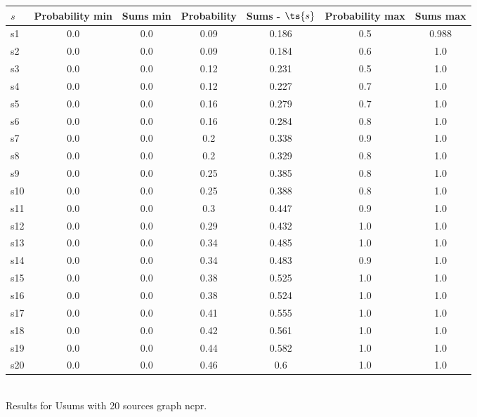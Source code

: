 \documentclass{article}
\begin{document}
\noindent\begin{tabular}{|l|c|c|c|c|c|c|}
\hline
$s$& Probability min & Sums min & Probability & Sums - $\ts{s}$ & Probability max & Sums max\\
\hline
s1 &0.0 & 0.0 & 0.09 & 0.186 & 0.5 & 0.988\\
\hline
s2 &0.0 & 0.0 & 0.09 & 0.184 & 0.6 & 1.0\\
\hline
s3 &0.0 & 0.0 & 0.12 & 0.231 & 0.5 & 1.0\\
\hline
s4 &0.0 & 0.0 & 0.12 & 0.227 & 0.7 & 1.0\\
\hline
s5 &0.0 & 0.0 & 0.16 & 0.279 & 0.7 & 1.0\\
\hline
s6 &0.0 & 0.0 & 0.16 & 0.284 & 0.8 & 1.0\\
\hline
s7 &0.0 & 0.0 & 0.2 & 0.338 & 0.9 & 1.0\\
\hline
s8 &0.0 & 0.0 & 0.2 & 0.329 & 0.8 & 1.0\\
\hline
s9 &0.0 & 0.0 & 0.25 & 0.385 & 0.8 & 1.0\\
\hline
s10 &0.0 & 0.0 & 0.25 & 0.388 & 0.8 & 1.0\\
\hline
s11 &0.0 & 0.0 & 0.3 & 0.447 & 0.9 & 1.0\\
\hline
s12 &0.0 & 0.0 & 0.29 & 0.432 & 1.0 & 1.0\\
\hline
s13 &0.0 & 0.0 & 0.34 & 0.485 & 1.0 & 1.0\\
\hline
s14 &0.0 & 0.0 & 0.34 & 0.483 & 0.9 & 1.0\\
\hline
s15 &0.0 & 0.0 & 0.38 & 0.525 & 1.0 & 1.0\\
\hline
s16 &0.0 & 0.0 & 0.38 & 0.524 & 1.0 & 1.0\\
\hline
s17 &0.0 & 0.0 & 0.41 & 0.555 & 1.0 & 1.0\\
\hline
s18 &0.0 & 0.0 & 0.42 & 0.561 & 1.0 & 1.0\\
\hline
s19 &0.0 & 0.0 & 0.44 & 0.582 & 1.0 & 1.0\\
\hline
s20 &0.0 & 0.0 & 0.46 & 0.6 & 1.0 & 1.0\\
\hline
\end{tabular}\\

\noindent Results for Usums with 20 sources graph ncpr.
\end{document}
